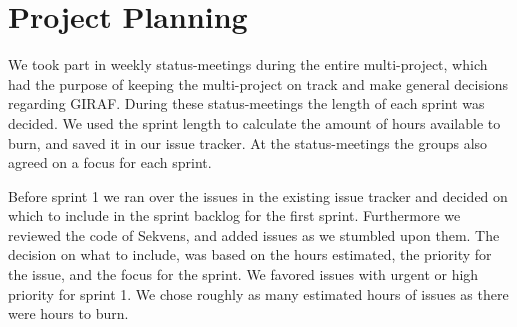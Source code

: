 \section{Project Planning}\label{spr1_projplan}
We took part in weekly status-meetings during the entire multi-project, which had the purpose of keeping the multi-project on track and make general decisions regarding GIRAF. During these status-meetings the length of each sprint was decided. We used the sprint length to calculate the amount of hours available to burn, and saved it in our issue tracker. At the status-meetings the groups also agreed on a focus for each sprint.

Before sprint 1 we ran over the issues in the existing issue tracker and decided on which to include in the sprint backlog for the first sprint. Furthermore we reviewed the code of Sekvens, and added issues as we stumbled upon them. The decision on what to include, was based on the hours estimated, the priority for the issue, and the focus for the sprint. We favored issues with urgent or high priority for sprint 1. We chose roughly as many estimated hours of issues as there were hours to burn. 